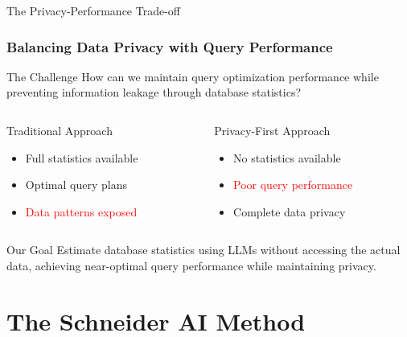 \documentclass[smaller]{beamer}
\begin{document}
\begin{frame}{The Privacy-Performance Trade-off}
\frametitle{Balancing Data Privacy with Query Performance}

\begin{block}{The Challenge}
How can we maintain query optimization performance while preventing information leakage through database statistics?
\end{block}

\vspace{0.5cm}

\begin{columns}[T]
\begin{column}{0.5\textwidth}
\begin{exampleblock}{Traditional Approach}
\begin{itemize}
    \item Full statistics available
    \item Optimal query plans
    \item \textcolor{red}{Data patterns exposed}
\end{itemize}
\end{exampleblock}
\end{column}

\begin{column}{0.5\textwidth}
\begin{exampleblock}{Privacy-First Approach}
\begin{itemize}
    \item No statistics available
    \item \textcolor{red}{Poor query performance}
    \item Complete data privacy
\end{itemize}
\end{exampleblock}
\end{column}
\end{columns}

\vspace{0.5cm}

\begin{alertblock}{Our Goal}
Estimate database statistics using LLMs without accessing the actual data, achieving near-optimal query performance while maintaining privacy.
\end{alertblock}

\end{frame}

\section{The Schneider AI Method}
\end{document}
